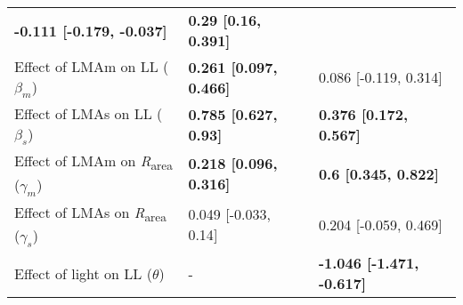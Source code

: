 \documentclass[
  12pt,
]{article}
\begin{document}
\begin{longtable}[]{@{}lll@{}}
\begin{minipage}[t]{0.26\columnwidth}
\textbf{-0.111 {[}-0.179, -0.037{]}}\strut
\end{minipage} & \begin{minipage}[t]{0.26\columnwidth}\raggedright
\textbf{0.29 {[}0.16, 0.391{]}}\strut
\end{minipage}\tabularnewline
\begin{minipage}[t]{0.39\columnwidth}\raggedright
Effect of LMAm on LL (\(\beta_m\))\strut
\end{minipage} & \begin{minipage}[t]{0.26\columnwidth}\raggedright
\textbf{0.261 {[}0.097, 0.466{]}}\strut
\end{minipage} & \begin{minipage}[t]{0.26\columnwidth}\raggedright
0.086 {[}-0.119, 0.314{]}\strut
\end{minipage}\tabularnewline
\begin{minipage}[t]{0.39\columnwidth}\raggedright
Effect of LMAs on LL (\(\beta_s\))\strut
\end{minipage} & \begin{minipage}[t]{0.26\columnwidth}\raggedright
\textbf{0.785 {[}0.627, 0.93{]}}\strut
\end{minipage} & \begin{minipage}[t]{0.26\columnwidth}\raggedright
\textbf{0.376 {[}0.172, 0.567{]}}\strut
\end{minipage}\tabularnewline
\begin{minipage}[t]{0.39\columnwidth}\raggedright
Effect of LMAm on \emph{R}\textsubscript{area} (\(\gamma_m\))\strut
\end{minipage} & \begin{minipage}[t]{0.26\columnwidth}\raggedright
\textbf{0.218 {[}0.096, 0.316{]}}\strut
\end{minipage} & \begin{minipage}[t]{0.26\columnwidth}\raggedright
\textbf{0.6 {[}0.345, 0.822{]}}\strut
\end{minipage}\tabularnewline
\begin{minipage}[t]{0.39\columnwidth}\raggedright
Effect of LMAs on \emph{R}\textsubscript{area} (\(\gamma_s\))\strut
\end{minipage} & \begin{minipage}[t]{0.26\columnwidth}\raggedright
0.049 {[}-0.033, 0.14{]}\strut
\end{minipage} & \begin{minipage}[t]{0.26\columnwidth}\raggedright
0.204 {[}-0.059, 0.469{]}\strut
\end{minipage}\tabularnewline
\begin{minipage}[t]{0.39\columnwidth}\raggedright
Effect of light on LL (\(\theta\))\strut
\end{minipage} & \begin{minipage}[t]{0.26\columnwidth}\raggedright
-\strut
\end{minipage} & \begin{minipage}[t]{0.26\columnwidth}\raggedright
\textbf{-1.046 {[}-1.471, -0.617{]}}\strut
\end{minipage}\tabularnewline
\bottomrule
\end{longtable}
\end{document}
